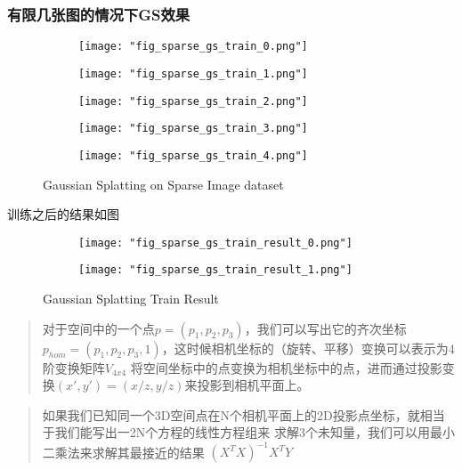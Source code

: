 \documentclass{njupre/njupre}
\begin{document}
\begin{frame}
    \frametitle{有限几张图的情况下GS效果}
    \begin{figure}
        \begin{subfigure}{0.18\linewidth}
            \texttt{[image: "fig\_sparse\_gs\_train\_0.png"]}
        \end{subfigure}
        \begin{subfigure}{0.18\linewidth}
            \texttt{[image: "fig\_sparse\_gs\_train\_1.png"]}
        \end{subfigure}
        \begin{subfigure}{0.18\linewidth}
            \texttt{[image: "fig\_sparse\_gs\_train\_2.png"]}
        \end{subfigure}
        \begin{subfigure}{0.18\linewidth}
            \texttt{[image: "fig\_sparse\_gs\_train\_3.png"]}
        \end{subfigure}
        \begin{subfigure}{0.18\linewidth}
            \texttt{[image: "fig\_sparse\_gs\_train\_4.png"]}
        \end{subfigure}
        \caption{Gaussian Splatting on Sparse Image dataset}
    \end{figure}
    训练之后的结果如图

    \begin{figure}
        \begin{subfigure}{0.38\linewidth}
            \texttt{[image: "fig\_sparse\_gs\_train\_result\_0.png"]}
        \end{subfigure}
        \begin{subfigure}{0.38\linewidth}
            \texttt{[image: "fig\_sparse\_gs\_train\_result\_1.png"]}
        \end{subfigure}
        \caption{Gaussian Splatting Train Result}
    \end{figure}
\end{frame}

\begin{frame}
    \begin{quote}
        对于空间中的一个点$p=(p_1,p_2,p_3)$，我们可以写出它的齐次坐标
        $p_{hom}=(p_1,p_2,p_3,1)$，这时候相机坐标的（旋转、平移）变换可以表示为4阶变换矩阵$V_{4x4}$
        将空间坐标中的点变换为相机坐标中的点，进而通过投影变换$(x',y')=(x/z,y/z)$来投影到相机平面上。
    \end{quote}
    \begin{quote}
        如果我们已知同一个3D空间点在N个相机平面上的2D投影点坐标，就相当于我们能写出一2N个方程的线性方程组来
        求解3个未知量，我们可以用最小二乘法来求解其最接近的结果 $(X^TX)^{-1}X^TY$
    \end{quote}
\end{frame}
\end{document}
